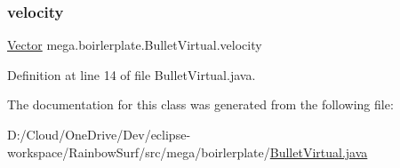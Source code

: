 \subsubsection{\texorpdfstring{velocity}{velocity}}
{\footnotesize\ttfamily \hyperlink{classmega_1_1boirlerplate_1_1_vector}{Vector} mega.\+boirlerplate.\+Bullet\+Virtual.\+velocity\hspace{0.3cm}{\ttfamily [private]}}



Definition at line 14 of file Bullet\+Virtual.\+java.



The documentation for this class was generated from the following file\+:\begin{DoxyCompactItemize}
\item 
D\+:/\+Cloud/\+One\+Drive/\+Dev/eclipse-\/workspace/\+Rainbow\+Surf/src/mega/boirlerplate/\hyperlink{_bullet_virtual_8java}{Bullet\+Virtual.\+java}\end{DoxyCompactItemize}

